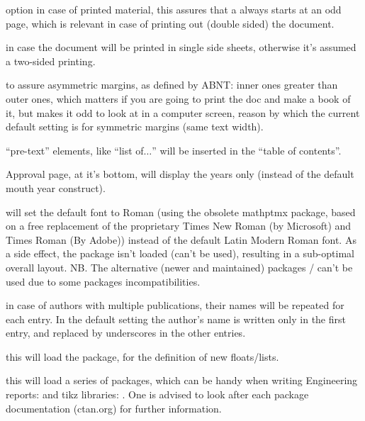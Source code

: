 \documentclass[article,nofontwarning,nogeometry,english,tocdepth=3,secdepth=3]{ufrgscca} %
\begin{document}
\begin{describelist}{option}
	 { in case of printed material, this assures that a \tsmacro{\chapter}{} always starts at an odd page, which is relevant in case of printing out (double sided) the document.}

	 { in case the document will be printed in single side sheets, otherwise it's assumed a two-sided printing.}

	 {to assure asymmetric margins, as defined by ABNT: inner ones greater than outer ones, which matters if you are going to print the doc and make a book of it, but makes it odd to look at in a computer screen, reason by which the current default setting is for symmetric margins (same text width).}

     { “pre-text” elements, like “list of$\dots$” will be inserted in the “table of contents”.}

     { Approval page, at it’s bottom,  will display the years only (instead of the default mouth year construct).}

     { will set the default font to Roman (using the obsolete mathptmx package, based on  a free replacement of the proprietary 
    Times New Roman (by Microsoft) and Times Roman (By Adobe)) instead of the default Latin Modern Roman font. 
    As a side effect, the package  isn't loaded (can't be used), resulting in a sub-optimal overall layout. 
    NB. The alternative (newer and maintained) packages / can't be used due to some packages incompatibilities.}

	 { in case of authors with multiple publications, their names will be repeated for each entry. 
In the default setting the author's name is written only in the first entry, and replaced by underscores in the other entries.}

	 { this will load the  package, for the definition of new floats/lists.}

	 { this will load a series of packages, which can be handy when writing Engineering reports:
       and tikz libraries: . 
       One is advised to look after each package documentation (ctan.org) for further information.}


\end{describelist}
\end{document}

